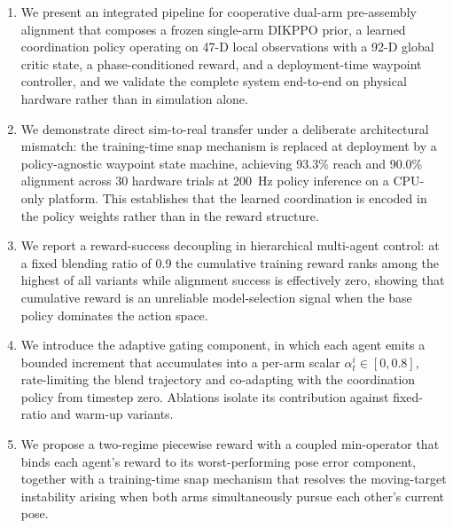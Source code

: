 \documentclass[a4paper,fleqn]{cas-dc}
\begin{document}
\begin{enumerate}
    \item We present an integrated pipeline for cooperative dual-arm pre-assembly alignment that composes a frozen single-arm DIKPPO prior, a learned coordination policy operating on 47-D local observations with a 92-D global critic state, a phase-conditioned reward, and a deployment-time waypoint controller, and we validate the complete system end-to-end on physical hardware rather than in simulation alone.
    \item We demonstrate direct sim-to-real transfer under a deliberate architectural mismatch: the training-time snap mechanism is replaced at deployment by a policy-agnostic waypoint state machine, achieving 93.3\% reach and 90.0\% alignment across 30 hardware trials at 200~Hz policy inference on a CPU-only platform. This establishes that the learned coordination is encoded in the policy weights rather than in the reward structure.
    \item We report a reward-success decoupling in hierarchical multi-agent control: at a fixed blending ratio of 0.9 the cumulative training reward ranks among the highest of all variants while alignment success is effectively zero, showing that cumulative reward is an unreliable model-selection signal when the base policy dominates the action space.
    \item We introduce the adaptive gating component, in which each agent emits a bounded increment that accumulates into a per-arm scalar $\alpha^i_t \in [0, 0.8]$, rate-limiting the blend trajectory and co-adapting with the coordination policy from timestep zero. Ablations isolate its contribution against fixed-ratio and warm-up variants.
    \item We propose a two-regime piecewise reward with a coupled min-operator that binds each agent's reward to its worst-performing pose error component, together with a training-time snap mechanism that resolves the moving-target instability arising when both arms simultaneously pursue each other's current pose.
\end{enumerate}
\end{document}

